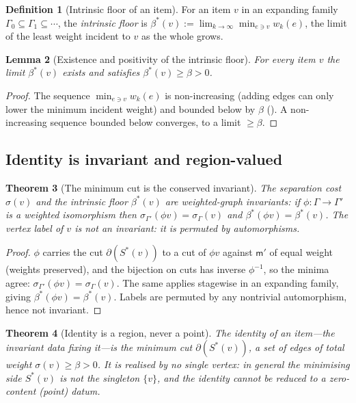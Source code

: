 \documentclass[11pt,twocolumn,a4paper]{article}
\theoremstyle{thmstyle}
\newtheorem{theorem}{Theorem}[section]
\newtheorem{lemma}[theorem]{Lemma}
\theoremstyle{definition}
\newtheorem{definition}[theorem]{Definition}
\theoremstyle{remark}
\newcommand{\Gph}{\Gamma}
\newcommand{\wt}{w}
\newcommand{\med}{\mathsf{m}}            %
\newcommand{\flo}{\beta}                 %
\newcommand{\cut}{\partial}              %
\newcommand{\str}{\sigma}                %
\begin{document}
\begin{definition}[Intrinsic floor of an item]
\label{def:intrinsic}
For an item $v$ in an expanding family $\Gph_0\subseteq\Gph_1\subseteq
\cdots$, the \emph{intrinsic floor} is
$\flo^{\ast}(v):=\lim_{k\to\infty}\min_{e\ni v}\wt_k(e)$, the limit of the
least weight incident to $v$ as the whole grows.
\end{definition}

\begin{lemma}[Existence and positivity of the intrinsic floor]
\label{lem:intrinsic}
For every item $v$ the limit $\flo^{\ast}(v)$ exists and satisfies
$\flo^{\ast}(v)\ge\flo>0$.
\end{lemma}

\begin{proof}
The sequence $\min_{e\ni v}\wt_k(e)$ is non-increasing (adding edges can
only lower the minimum incident weight) and bounded below by $\flo$
(). A non-increasing sequence bounded below converges, to
a limit $\ge\flo$.
\end{proof}

\subsection{Identity is invariant and region-valued}

\begin{theorem}[The minimum cut is the conserved invariant]
\label{thm:invariant}
The separation cost $\str(v)$ and the intrinsic floor $\flo^{\ast}(v)$ are
weighted-graph invariants: if $\phi\colon\Gph\to\Gph'$ is a weighted
isomorphism then $\str_{\Gph'}(\phi v)=\str_{\Gph}(v)$ and
$\flo^{\ast}(\phi v)=\flo^{\ast}(v)$. The vertex label of $v$ is not an
invariant: it is permuted by automorphisms.
\end{theorem}

\begin{proof}
$\phi$ carries the cut $\cut(S^{\ast}(v))$ to a cut of $\phi v$ against
$\med'$ of equal weight (weights preserved), and the bijection on cuts has
inverse $\phi^{-1}$, so the minima agree:
$\str_{\Gph'}(\phi v)=\str_\Gph(v)$. The same applies stagewise in an
expanding family, giving $\flo^{\ast}(\phi v)=\flo^{\ast}(v)$. Labels are
permuted by any nontrivial automorphism, hence not invariant.
\end{proof}

\begin{theorem}[Identity is a region, never a point]
\label{thm:region}
The identity of an item---the invariant data fixing it---is the minimum
cut $\cut(S^{\ast}(v))$, a set of edges of total weight $\str(v)\ge\flo>0$.
It is realised by no single vertex: in general the minimising side
$S^{\ast}(v)$ is not the singleton $\{v\}$, and the identity cannot be
reduced to a zero-content (point) datum.
\end{theorem}
\end{document}

